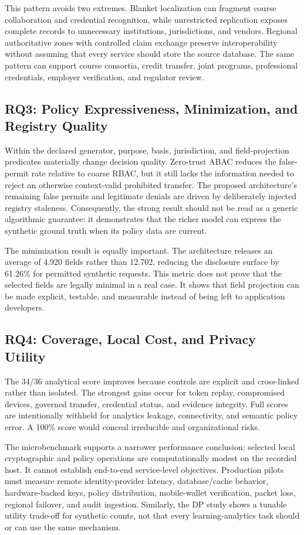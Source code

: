 \documentclass[journal]{IEEEtran}
\begin{document}
This pattern avoids two extremes. Blanket localization can fragment course collaboration and credential recognition, while unrestricted replication exposes complete records to unnecessary institutions, jurisdictions, and vendors. Regional authoritative zones with controlled claim exchange preserve interoperability without assuming that every service should store the source database. The same pattern can support course consortia, credit transfer, joint programs, professional credentials, employer verification, and regulator review.

\subsection{RQ3: Policy Expressiveness, Minimization, and Registry Quality}
Within the declared generator, purpose, basis, jurisdiction, and field-projection predicates materially change decision quality. Zero-trust ABAC reduces the false-permit rate relative to coarse RBAC, but it still lacks the information needed to reject an otherwise context-valid prohibited transfer. The proposed architecture's remaining false permits and legitimate denials are driven by deliberately injected registry staleness. Consequently, the strong result should not be read as a generic algorithmic guarantee: it demonstrates that the richer model can express the synthetic ground truth when its policy data are current.

The minimization result is equally important. The architecture releases an average of 4.920 fields rather than 12.702, reducing the disclosure surface by 61.26\% for permitted synthetic requests. This metric does not prove that the selected fields are legally minimal in a real case. It shows that field projection can be made explicit, testable, and measurable instead of being left to application developers.

\subsection{RQ4: Coverage, Local Cost, and Privacy Utility}
The 34/36 analytical score improves because controls are explicit and cross-linked rather than isolated. The strongest gains occur for token replay, compromised devices, governed transfer, credential status, and evidence integrity. Full scores are intentionally withheld for analytics leakage, connectivity, and semantic policy error. A 100\% score would conceal irreducible and organizational risks.

The microbenchmark supports a narrower performance conclusion: selected local cryptographic and policy operations are computationally modest on the recorded host. It cannot establish end-to-end service-level objectives. Production pilots must measure remote identity-provider latency, database/cache behavior, hardware-backed keys, policy distribution, mobile-wallet verification, packet loss, regional failover, and audit ingestion. Similarly, the DP study shows a tunable utility trade-off for synthetic counts, not that every learning-analytics task should or can use the same mechanism.
\end{document}

